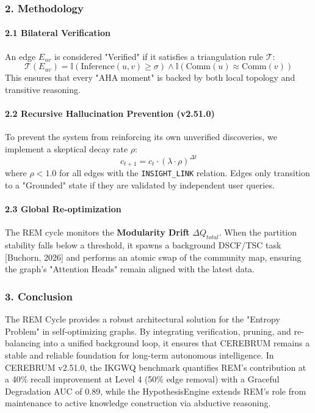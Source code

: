 \subsubsection{2. Methodology}

\paragraph{2.1 Bilateral Verifi\-cation}
An edge $E_{uv}$ is considered "Verified" if it satisfies a trian\-gulation rule $\mathcal{T}$:
\begin{equation}
\mathcal{T}(E_{uv}) = \mathbb{I}(\text{Inference}(u,v) \geq \sigma) \land \mathbb{I}(\text{Comm}(u) \approx \text{Comm}(v))
\end{equation}
This ensures that every "AHA moment" is backed by both local topology and transitive reasoning.

\paragraph{2.2 Recursive Halluc\-ination Prevention (v2.51.0)}
To prevent the system from reinforcing its own unverified discoveries, we implement a skeptical decay rate $\rho$:
\begin{equation}
c_{t+1} = c_t \cdot (\lambda \cdot \rho)^{\Delta t}
\end{equation}
where $\rho < 1.0$ for all edges with the \texttt{INSIGHT\_LINK} relation. Edges only transition to a "Grounded" state if they are validated by independent user queries.

\paragraph{2.3 Global Re-optim\-ization}
The REM cycle monitors the \textbf{Modularity Drift} $\Delta Q_{total}$. When the partition stability falls below a threshold, it spawns a background DSCF/TSC task [Buchorn, 2026] and performs an atomic swap of the community map, ensuring the graph's "Attention Heads" remain aligned with the latest data.

\subsubsection{3. Conclusion}
The REM Cycle provides a robust archi\-tectural solution for the "Entropy Problem" in self-optimizing graphs. By integrating verif\-ication, pruning, and re-balancing into a unified background loop, it ensures that CEREBRUM remains a stable and reliable foundation for long-term autonomous intel\-ligence. In CEREBRUM v2.51.0, the IKGWQ benchmark quantifies REM's contr\-ibution at a 40\% recall improvement at Level 4 (50\% edge removal) with a Graceful Degradation AUC of 0.89, while the HypothesisEngine extends REM's role from maintenance to active knowledge const\-ruction via abductive reasoning.

